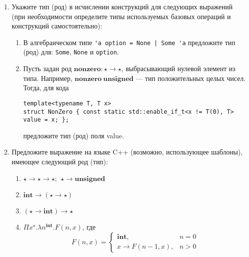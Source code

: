 \documentclass[10pt,a4paper,oneside]{article}
\begin{document}
\begin{enumerate}
\item Укажите тип (род) в исчислении конструкций для следующих выражений (при необходимости определите
типы используемых базовых операций и конструкций самостоятельно):
\begin{enumerate}
\item В алгебраическом типе \verb!'a option = None | Some 'a! предложите тип (род) для: \verb!Some!,
\verb!None! и \verb!option!.
\item Пусть задан род $\textbf{nonzero}: \star\rightarrow\star$, выбрасывающий нулевой элемент из
типа. Например, $\textbf{nonzero}\ \textbf{unsigned}$ --- тип положительных целых чисел.
Тогда, для кода
\begin{verbatim}
template<typename T, T x>
struct NonZero { const static std::enable_if_t<x != T(0), T> value = x; };
\end{verbatim}
предложите тип (род) поля value.
\end{enumerate}

\item Предложите выражение на языке C++ (возможно, использующее шаблоны), имеющее следующий род (тип):
\begin{enumerate}
\item $\star\rightarrow\star\rightarrow\star$; $\ \star\rightarrow\textbf{unsigned}$
\item $\textbf{int}\rightarrow(\star\rightarrow\star)$
\item $(\star\rightarrow\textbf{int})\rightarrow\star$
\item $\Pi x^\star.\lambda n^\textbf{int}.F(n,x)$, где $$F(n,x) = \left\{\begin{array}{ll}\textbf{int}, & n = 0\\
                                   x\rightarrow F(n-1,x), & n > 0\end{array}\right.$$
\end{enumerate}



\end{enumerate}
\end{document}
